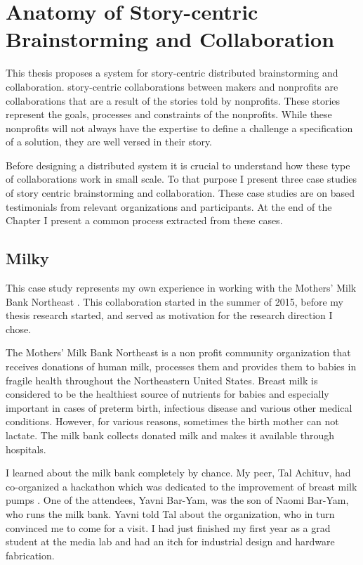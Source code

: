 \chapter{Anatomy of Story-centric Brainstorming and Collaboration }
\label{chap_anatomy}

This thesis proposes a system for story-centric distributed brainstorming and collaboration. story-centric collaborations between makers and nonprofits are collaborations that are a result of the stories told by nonprofits. These stories represent the goals, processes and constraints of the nonprofits. While these nonprofits will not always have the expertise to define a challenge a specification of a solution, they are well versed in their story.

Before designing a distributed system it is crucial to understand how these type of collaborations work in small scale. To that purpose I present three case studies of story centric brainstorming and collaboration. These case studies are on based testimonials from relevant organizations and participants. At the end of the Chapter I present a common process extracted from these cases. 

\section{Milky}
This case study represents my own experience in working with the Mothers' Milk Bank Northeast \cite{mmne}. This collaboration started in the summer of 2015, before my thesis research started, and served as motivation for the research direction I chose.

The Mothers' Milk Bank Northeast is a non profit community organization that receives donations of human milk, processes them and provides them to babies in fragile health throughout the Northeastern United States. Breast milk is considered to be the healthiest source of nutrients for babies and especially important in cases of preterm birth, infectious disease and various other medical conditions.\cite{} However, for various reasons, sometimes the birth mother can not lactate. The milk bank collects donated milk and makes it available through hospitals. 

I learned about the milk bank completely by chance. My peer, Tal Achituv, had co-organized a hackathon which was dedicated to the improvement of breast milk pumps \cite{d2016feminist}. One of the attendees, Yavni Bar-Yam, was the son of Naomi Bar-Yam, who runs the milk bank. Yavni told Tal about the organization, who in turn convinced me to come for a visit. I had just finished my first year as a grad student at the media lab and had an itch for industrial design and hardware fabrication.

